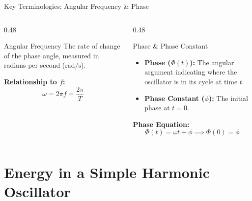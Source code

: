 \documentclass[aspectratio=169,xcolor=dvipsnames]{beamer}
\begin{document}
\begin{frame}{Key Terminologies: Angular Frequency \& Phase}
  \begin{columns}[T]
    \begin{column}{0.48\textwidth}
      \begin{umdefinition}{Angular Frequency}
        The rate of change of the phase angle, measured in radians per second ($\text{rad/s}$).

        \vspace{0.5em}
        \textbf{Relationship to $f$:}
        \[
          \omega = 2\pi f = \frac{2\pi}{T}
        \]
      \end{umdefinition}
    \end{column}
    \begin{column}{0.48\textwidth}
      \begin{umdefinition}{Phase \& Phase Constant}
        \begin{itemize}
          \item \textbf{Phase ($\Phi(t)$):} The angular argument indicating where the oscillator is in its cycle at time $t$.
          \item \textbf{Phase Constant ($\phi$):} The initial phase at $t=0$.
        \end{itemize}

        \vspace{0.5em}
        \textbf{Phase Equation:}
        \[
          \Phi(t) = \omega t + \phi \implies \Phi(0) = \phi
        \]
      \end{umdefinition}
    \end{column}
  \end{columns}
\end{frame}

\section{Energy in a Simple Harmonic Oscillator}
\end{document}
